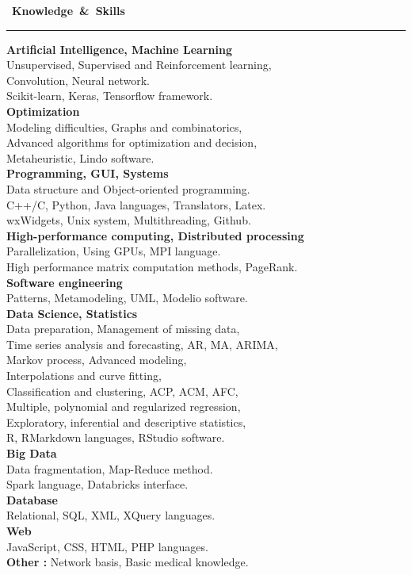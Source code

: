 \documentclass[a4paper]{article}
\begin{document}
\begin{titlepage}
\medskip

\mbox{\Large \comfortaa \textbf{ \faToolbox \hspace{0.2cm} Knowledge \& Skills}}\\
\rule{0.8\linewidth}{0.01mm}
\begin{multicols}{2}
\textbf{Artificial Intelligence, Machine Learning}\\
Unsupervised, Supervised and Reinforcement learning,\\
Convolution, Neural network.\\
Scikit-learn, Keras, Tensorflow framework.\\[0.2cm]
\textbf{Optimization}\\
Modeling difficulties, Graphs and combinatorics,\\
Advanced algorithms for optimization and decision,\\
Metaheuristic, Lindo software.\\[0.2cm]
\textbf{Programming, GUI, Systems}\\
Data structure and Object-oriented programming.\\
C++/C, Python, Java languages, Translators, Latex.\\
wxWidgets, Unix system, Multithreading, Github.\\[0.2cm]
\textbf{High-performance computing, Distributed processing}\\
Parallelization, Using GPUs, MPI language.\\
High performance matrix computation methods, PageRank.\\[0.2cm]
\textbf{Software engineering}\\
Patterns, Metamodeling, UML, Modelio software.\\[0.2cm]
\textbf{Data Science, Statistics}\\
Data preparation, Management of missing data,\\
Time series analysis and forecasting, AR, MA, ARIMA,\\
Markov process, Advanced modeling,\\
Interpolations and curve fitting,\\
Classification and clustering, ACP, ACM, AFC,\\
Multiple, polynomial and regularized regression,\\
Exploratory, inferential and descriptive statistics,\\
R, RMarkdown languages, RStudio software.\\[0.2cm]
\textbf{Big Data}\\
Data fragmentation, Map-Reduce method.\\
Spark language, Databricks interface.\\[0.2cm]
\textbf{Database}\\
Relational, SQL, XML, XQuery languages.\\[0.2cm]
\textbf{Web}\\
JavaScript, CSS, HTML, PHP languages.\\[0.2cm]
\textbf{Other :} Network basis, Basic medical knowledge.
\end{multicols}


\end{titlepage}
\end{document}
